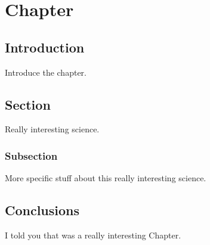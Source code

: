 \chapter{Chapter}
\label{ch: Chapter}









\section{Introduction}
\label{sec: Introduction}

Introduce the chapter.



\section{Section}
\label{sec: Section}

Really interesting science.


\subsection{Subsection}
\label{sec: Subsection}

More specific stuff about this really interesting science.



\section{Conclusions}
\label{sec: Conclusions}

I told you that was a really interesting Chapter.
